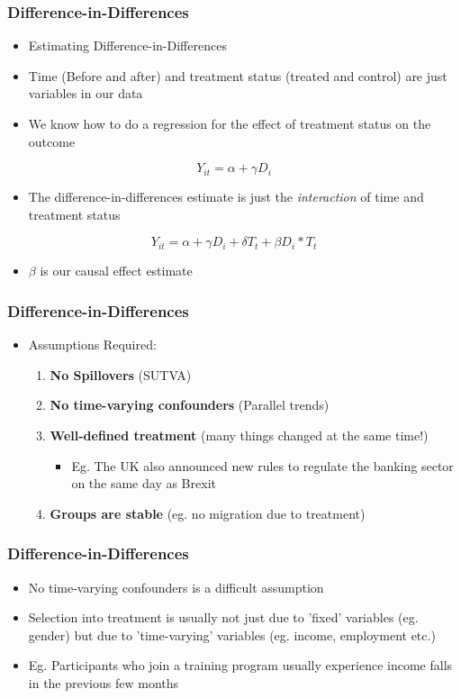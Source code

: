\documentclass[xcolor=x11names,compress]{beamer}\usepackage[]{graphicx}\usepackage[]{color}
\renewcommand{\(}{\begin{columns}}
\renewcommand{\)}{\end{columns}}
\newcommand{\<}[1]{\begin{column}{#1}}
\renewcommand{\>}{\end{column}}
\begin{document}
\begin{frame}
\frametitle{Difference-in-Differences}
\begin{itemize}
\item Estimating Difference-in-Differences
\pause
\item Time (Before and after) and treatment status (treated and control) are just variables in our data
\pause
\item We know how to do a regression for the effect of treatment status on the outcome
\end{itemize}
$$ Y_{it} = \alpha + \gamma D_i$$
\pause
\begin{itemize}
\item The difference-in-differences estimate is just the \textit{interaction} of time and treatment status
\end{itemize}
$$ Y_{it} = \alpha + \gamma D_i + \delta T_t + \beta D_i * T_t $$
\begin{itemize}
\item $\beta$ is our causal effect estimate
\end{itemize}
\end{frame}

\begin{frame}
\frametitle{Difference-in-Differences}
\begin{itemize}
\item Assumptions Required:
\begin{enumerate}
\item \textbf{No Spillovers} (SUTVA)
\item \textbf{No time-varying confounders} (Parallel trends)
\item \textbf{Well-defined treatment} (many things changed at the same time!)
\begin{itemize}
\item Eg. The UK also announced new rules to regulate the
banking sector on the same day as Brexit
\end{itemize}
\item \textbf{Groups are stable} (eg. no migration due to treatment)
\end{enumerate}
\end{itemize}
\end{frame}

\begin{frame}
\frametitle{Difference-in-Differences}
\begin{itemize}
\item No time-varying confounders is a difficult assumption
\pause
\item Selection into treatment is usually not just due to 'fixed' variables (eg. gender) but due to 'time-varying' variables (eg. income, employment etc.)
\pause
\item Eg. Participants who join a training program usually experience income falls in the previous few months
\end{itemize}
\end{frame}
\end{document}
